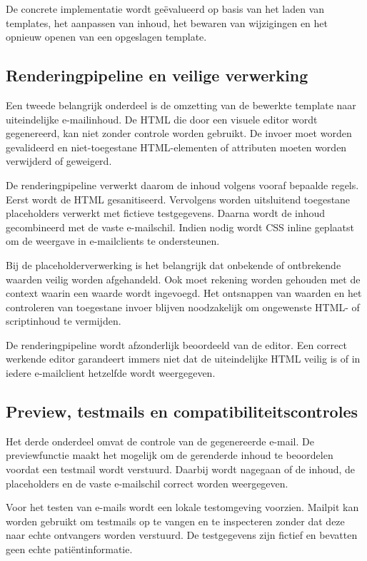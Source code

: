 De concrete implementatie wordt geëvalueerd op basis van het laden van
templates, het aanpassen van inhoud, het bewaren van wijzigingen en het
opnieuw openen van een opgeslagen template.

\subsection{Renderingpipeline en veilige verwerking}
Een tweede belangrijk onderdeel is de omzetting van de bewerkte template
naar uiteindelijke e-mailinhoud. De HTML die door een visuele editor wordt
gegenereerd, kan niet zonder controle worden gebruikt. De invoer moet worden
gevalideerd en niet-toegestane HTML-elementen of attributen moeten worden
verwijderd of geweigerd.

De renderingpipeline verwerkt daarom de inhoud volgens vooraf bepaalde
regels. Eerst wordt de HTML gesanitiseerd. Vervolgens worden uitsluitend
toegestane placeholders verwerkt met fictieve testgegevens. Daarna wordt de
inhoud gecombineerd met de vaste e-mailschil. Indien nodig wordt CSS inline
geplaatst om de weergave in e-mailclients te ondersteunen.

Bij de placeholderverwerking is het belangrijk dat onbekende of ontbrekende
waarden veilig worden afgehandeld. Ook moet rekening worden gehouden met de
context waarin een waarde wordt ingevoegd. Het ontsnappen van waarden en het
controleren van toegestane invoer blijven noodzakelijk om ongewenste HTML-
of scriptinhoud te vermijden.

De renderingpipeline wordt afzonderlijk beoordeeld van de editor. Een
correct werkende editor garandeert immers niet dat de uiteindelijke HTML
veilig is of in iedere e-mailclient hetzelfde wordt weergegeven.

\subsection{Preview, testmails en compatibiliteitscontroles}
Het derde onderdeel omvat de controle van de gegenereerde e-mail. De
previewfunctie maakt het mogelijk om de gerenderde inhoud te beoordelen
voordat een testmail wordt verstuurd. Daarbij wordt nagegaan of de inhoud,
de placeholders en de vaste e-mailschil correct worden weergegeven.

Voor het testen van e-mails wordt een lokale testomgeving voorzien. Mailpit
kan worden gebruikt om testmails op te vangen en te inspecteren zonder dat
deze naar echte ontvangers worden verstuurd. De testgegevens zijn fictief
en bevatten geen echte patiëntinformatie.

